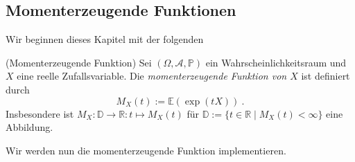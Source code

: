 \subsection{Momenterzeugende Funktionen}
\hypertarget{Sec:MomErzFun}{}Wir beginnen dieses Kapitel mit der folgenden

\begin{Definition}{(Momenterzeugende Funktion)}
Sei $(\Omega, \mathscr{A}, \mathbb{P})$ ein Wahrscheinlichkeitsraum und $X$ eine reelle Zufallsvariable. Die \textit{momenterzeugende Funktion von $X$}  ist definiert durch
\[M_X(t) := \mathbb{E}\left( \exp(t X) \right)~.\]
Insbesondere ist $M_X: \mathbb{D} \rightarrow \mathbb{R}: t \mapsto M_X(t)$ für $\mathbb{D} := \{ t \in \mathbb{R} \mid M_X(t) < \infty\}$ eine Abbildung.
\end{Definition}

\newpage

Wir werden nun die momenterzeugende Funktion implementieren.

